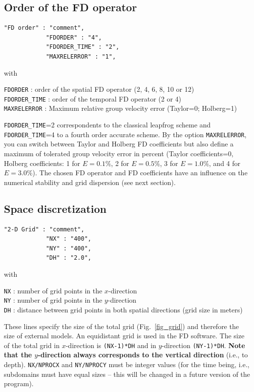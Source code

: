 \subsection{Order of the FD operator}
\begin{verbatim}
"FD order" : "comment",
            "FDORDER" : "4",
            "FDORDER_TIME" : "2",
            "MAXRELERROR" : "1",
\end{verbatim}

with

\texttt{FDORDER} : order of the spatial FD operator (2, 4, 6, 8, 10 or 12)\\
\texttt{FDORDER\_TIME} : order of the temporal FD operator (2 or 4)\\
\texttt{MAXRELERROR} : Maximum relative group velocity error (Taylor=0; Holberg=1)

\texttt{FDORDER\_TIME}=2 correspondents to the classical leapfrog scheme and \texttt{FDORDER\_TIME}=4 to a fourth order accurate scheme. By the option \texttt{MAXRELERROR}, you can switch between Taylor and Holberg FD coefficients but also define a maximum of tolerated group velocity error in percent (Taylor coefficients=0, Holberg coefficients: 1 for $E=0.1\%$, 2 for $E=0.5\%$, 3 for $E=1.0\%$, and 4 for $E=3.0\%$). The chosen FD operator and FD coefficients have an influence on the numerical stability and grid dispersion (see next section).

\subsection{Space discretization}
\begin{verbatim}
"2-D Grid" : "comment",
            "NX" : "400",
            "NY" : "400",
            "DH" : "2.0",
\end{verbatim}

with

\texttt{NX} : number of grid points in the $x$-direction \\
\texttt{NY} : number of grid points in the $y$-direction\\
\texttt{DH} : distance between grid points in both spatial directions (grid size in meters)

These lines specify the size of the total grid (Fig.~\ref{fig_grid}) and therefore the size of external models. An equidistant grid is used in the FD software. The size of the total grid in $x$-direction is \texttt{(NX-1)*DH} and in $y$-direction \texttt{(NY-1)*DH}. \textbf{Note that the $y$-direction always corresponds to the vertical direction} (i.e., to depth). \texttt{NX/NPROCX} and \texttt{NY/NPROCY} must be integer values (for the time being, i.e., subdomains must have equal sizes -- this will be changed in a future version of the program).

